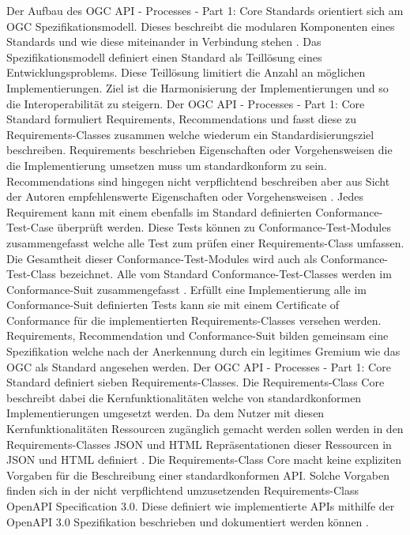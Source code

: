 Der Aufbau des OGC API - Processes - Part 1: Core Standards orientiert sich am OGC Spezifikationsmodell. Dieses beschreibt die modularen Komponenten eines Standards und 
wie diese miteinander in Verbindung stehen \cite{ogc_specification_model}. Das Spezifikationsmodell definiert einen Standard als Teillösung eines Entwicklungsproblems.
Diese Teillösung limitiert die Anzahl an möglichen Implementierungen. Ziel ist die Harmonisierung der Implementierungen und so die Interoperabilität zu steigern.
Der OGC API - Processes - Part 1: Core Standard formuliert Requirements, Recommendations und fasst diese zu Requirements-Classes zusammen welche wiederum 
ein Standardisierungsziel beschreiben. Requirements beschrieben Eigenschaften oder Vorgehensweisen die die Implementierung umsetzen muss um standardkonform zu sein. 
Recommendations sind hingegen nicht verpflichtend beschreiben aber aus Sicht der Autoren empfehlenswerte Eigenschaften oder Vorgehensweisen \cite{ogc_specification_model}. 
Jedes Requirement kann mit einem ebenfalls im Standard definierten Conformance-Test-Case überprüft werden. Diese Tests können zu Conformance-Test-Modules zusammengefasst 
welche alle Test zum prüfen einer Requirements-Class umfassen. Die Gesamtheit dieser Conformance-Test-Modules wird auch als Conformance-Test-Class bezeichnet. Alle vom 
Standard Conformance-Test-Classes werden im Conformance-Suit zusammengefasst \cite{ogc_specification_model}. Erfüllt eine Implementierung alle im Conformance-Suit definierten 
Tests kann sie mit einem Certificate of Conformance für die implementierten Requirements-Classes versehen werden. Requirements, Recommendation und Conformance-Suit bilden 
gemeinsam eine Spezifikation welche nach der Anerkennung durch ein legitimes Gremium wie das OGC als Standard angesehen werden.
Der OGC API - Processes - Part 1: Core Standard definiert sieben Requirements-Classes. Die Requirements-Class Core beschreibt dabei die Kernfunktionalitäten welche 
von standardkonformen Implementierungen umgesetzt werden. Da dem Nutzer mit diesen Kernfunktionalitäten Ressourcen zugänglich gemacht werden sollen werden in den 
Requirements-Classes JSON und HTML Repräsentationen dieser Ressourcen in JSON und HTML definiert \cite{ogc_api_processes_core}. Die Requirements-Class Core macht keine
expliziten Vorgaben für die Beschreibung einer standardkonformen API. Solche Vorgaben finden sich in der nicht verpflichtend umzusetzenden Requirements-Class
OpenAPI Specification 3.0. Diese definiert wie implementierte APIs mithilfe der OpenAPI 3.0 Spezifikation beschrieben und dokumentiert werden können \cite{ogc_api_processes_core}.
